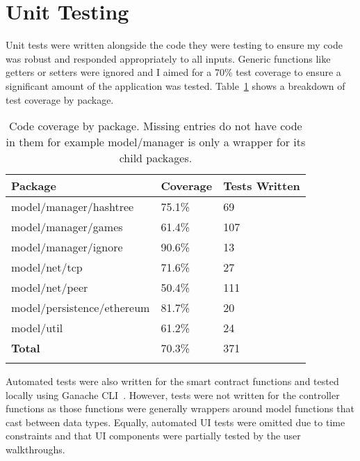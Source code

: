 \section{Unit Testing}

Unit tests were written alongside the code they were testing to ensure my code was robust and responded appropriately to all inputs. Generic functions like getters or setters were ignored and I aimed for a 70\% test coverage to ensure a significant amount of the application was tested. Table~\ref{tab:coverage} shows a breakdown of test coverage by package.

\begin{longtable}{p{} p{} p{}}
  \toprule
  \textbf{Package} & \textbf{Coverage} & \textbf{Tests Written}
  \\\midrule\midrule
  model/manager/hashtree
  & 75.1\%
  & 69
  \\
  model/manager/games
  & 61.4\%
  & 107
  \\
  model/manager/ignore
  & 90.6\%
  & 13
  \\
  model/net/tcp
  & 71.6\%
  & 27
  \\
  model/net/peer
  & 50.4\%
  & 111
  \\
  model/persistence/ethereum
  & 81.7\%
  & 20
  \\
  model/util
  & 61.2\%
  & 24
  \\\midrule\midrule
  \textbf{Total}
  & 70.3\%
  & 371
  \\\bottomrule\bottomrule
  \caption{Code coverage by package. Missing entries do not have code in them for example model/manager is only a wrapper for its child packages.}
  \label{tab:coverage}
\end{longtable}

\newparagraph
Automated tests were also written for the smart contract functions and tested locally using Ganache CLI~\cite{noauthor_trufflesuiteganache_2023}. However, tests were not written for the controller functions as those functions were generally wrappers around model functions that cast between data types. Equally, automated UI tests were omitted due to time constraints and that UI components were partially tested by the user walkthroughs.